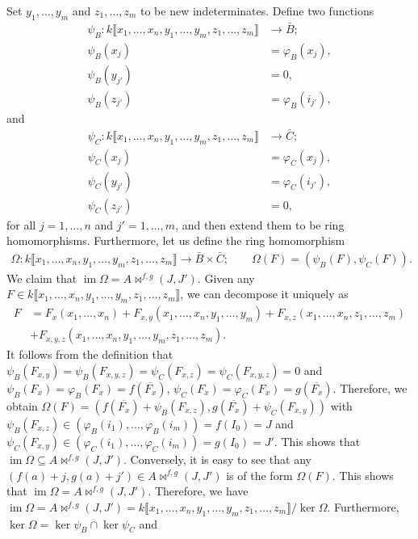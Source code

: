 \documentclass{amsart}%
\theoremstyle{plain}
\numberwithin{equation}{section}
\theoremstyle{definition}
\begin{document}
    Set $y_1,\ldots,y_m$ and $z_1,\ldots,z_m$ to be new indeterminates. Define two functions
    \begin{align*}
        \psi_B:k\llbracket x_1,\ldots ,x_n,y_1,\ldots,y_m,z_1,\ldots,z_m\rrbracket&\to \bar{B}; \\
        \psi_B(x_j)&=\varphi_B(x_j),\\
        \psi_B(y_{j'})&=0, \\
        \psi_B(z_{j'})&=\varphi_B(i_{j'}),
    \end{align*}
    and
    \begin{align*}
        \psi_C:k\llbracket x_1,\ldots ,x_n,y_1,\ldots,y_m,z_1,\ldots,z_m\rrbracket&\to \bar{C}; \\
        \psi_C(x_j)&=\varphi_C(x_j),\\
        \psi_C(y_{j'})&=\varphi_C(i_{j'}), \\
        \psi_C(z_{j'})&=0,
    \end{align*}
    for all $j=1,\ldots,n$ and $j'=1,\ldots,m$, and then extend them to be ring homomorphisms. Furthermore, let us define the ring homomorphism
    \begin{align*}
        \Omega:k\llbracket x_1,\ldots ,x_n,y_1,\ldots,y_m,z_1,\ldots,z_m\rrbracket\to \bar{B}\times \bar{C}; \qquad \Omega(F)=(\psi_B(F),\psi_C(F)).
    \end{align*}
    We claim that $\operatorname{im} \Omega=A\bowtie^{f,g}(J,J')$. Given any $F\in k\llbracket x_1,\ldots ,x_n,y_1,\ldots,y_m,z_1,\ldots,z_m\rrbracket$, we can decompose it uniquely as
    \begin{align*}
        F&=F_x(x_1,\ldots, x_n)+F_{x,y}(x_1,\ldots, x_n,y_1,\ldots, y_m)+F_{x,z}(x_1,\ldots, x_n,z_1,\ldots, z_m)\\
        &+F_{x,y,z}(x_1,\ldots, x_n,y_1,\ldots, y_m,z_1,\ldots,z_m).
    \end{align*} 
    It follows from the definition that $\psi_B(F_{x,y})=\psi_B(F_{x,y,z})=\psi_C(F_{x,z})=\psi_C(F_{x,y,z})=0$ and $\psi_B(F_x)=\varphi_B(F_x)=f(\overline{F_x})$, $\psi_C(F_x)=\varphi_C(F_x)=g(\overline{F_x})$. Therefore, we obtain $\Omega(F)=(f(\overline{F_x})+\psi_B(F_{x,z}),g(\overline{F_x})+\psi_C(F_{x,y}))$ with $\psi_B(F_{x,z})\in (\varphi_B(i_1),\ldots,\varphi_B(i_m))=f(I_0)=J$ and $\psi_C(F_{x,y})\in (\varphi_C(i_1),\ldots,\varphi_C(i_m))=g(I_0)=J'$. This shows that $\operatorname{im} \Omega\subseteq A\bowtie^{f,g}(J,J')$. Conversely, it is easy to see that any $(f(a)+j,g(a)+j')\in A\bowtie^{f,g}(J,J')$ is of the form $\Omega(F)$. This shows that $\operatorname{im} \Omega=A\bowtie^{f,g}(J,J')$. Therefore, we have $\operatorname{im} \Omega=A\bowtie^{f,g}(J,J')=k\llbracket x_1,\ldots ,x_n,y_1,\ldots,y_m,z_1,\ldots,z_m\rrbracket/\ker \Omega$. Furthermore, $\ker\Omega=\ker\psi_B\cap\ker\psi_C$ and
\end{document}
